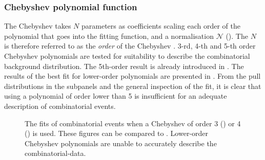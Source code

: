 \subsubsection{Chebyshev polynomial function}\label{sec:chebyshev_prefit}

The Chebyshev \PDF takes $N$ parameters as coefficients scaling each order of the polynomial that goes into the fitting function, and a normalisation $\mathcal{N}$ ().
The $N$ is therefore referred to as the \textit{order} of the Chebyshev \PDF.
3-rd, 4-th and 5-th order Chebyshev polynomials are tested for suitability to describe the combinatorial \BB background distribution.
The 5th-order result is already introduced in .
The results of the best fit for lower-order polynomials are presented in .
From the pull distributions in the subpanels and the general inspection of the fit, it is clear that using a polynomial of order lower than 5 is insufficient for an adequate description of combinatorial \BB events.

\begin{figure}[htbp!]
    \centering
    \caption{\label{fig:lower_order_chebyshev}The \Mbc fits of combinatorial \BB events when a Chebyshev \PDF of order 3 () or 4 () is used.
    These figures can be compared to .
    Lower-order Chebyshev polynomials are unable to accurately describe the combinatorial-\BB data.
    }
\end{figure}


